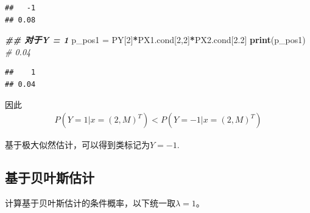 \documentclass[
]{ctexart}
\newenvironment{Shaded}{\begin{snugshade}}{\end{snugshade}}
\newcommand{\CommentTok}[1]{\textcolor[rgb]{0.56,0.35,0.01}{\textit{#1}}}
\newcommand{\DecValTok}[1]{\textcolor[rgb]{0.00,0.00,0.81}{#1}}
\newcommand{\DocumentationTok}[1]{\textcolor[rgb]{0.56,0.35,0.01}{\textbf{\textit{#1}}}}
\newcommand{\FloatTok}[1]{\textcolor[rgb]{0.00,0.00,0.81}{#1}}
\newcommand{\FunctionTok}[1]{\textcolor[rgb]{0.13,0.29,0.53}{\textbf{#1}}}
\newcommand{\NormalTok}[1]{#1}
\newcommand{\OtherTok}[1]{\textcolor[rgb]{0.56,0.35,0.01}{#1}}
\newcommand{\SpecialCharTok}[1]{\textcolor[rgb]{0.81,0.36,0.00}{\textbf{#1}}}
\begin{document}
\begin{verbatim}
##   -1 
## 0.08
\end{verbatim}

\begin{Shaded}
\begin{Highlighting}[]
\DocumentationTok{\#\# 对于Y = 1}
\NormalTok{p\_pos1 }\OtherTok{=}\NormalTok{ PY[}\DecValTok{2}\NormalTok{]}\SpecialCharTok{*}\NormalTok{PX1.cond[}\DecValTok{2}\NormalTok{,}\DecValTok{2}\NormalTok{]}\SpecialCharTok{*}\NormalTok{PX2.cond[}\FloatTok{2.2}\NormalTok{]}
\FunctionTok{print}\NormalTok{(p\_pos1) }\CommentTok{\# 0.04}
\end{Highlighting}
\end{Shaded}

\begin{verbatim}
##    1 
## 0.04
\end{verbatim}

因此 \begin{align*}
P(Y=1|x=(2,M)^T) < P(Y=-1|x=(2,M)^T)
\end{align*}

基于极大似然估计，可以得到类标记为\(Y = -1\).

\hypertarget{ux57faux4e8eux8d1dux53f6ux65afux4f30ux8ba1}{%
\subsection{基于贝叶斯估计}\label{ux57faux4e8eux8d1dux53f6ux65afux4f30ux8ba1}}

计算基于贝叶斯估计的条件概率，以下统一取\(\lambda = 1\)。
\end{document}
